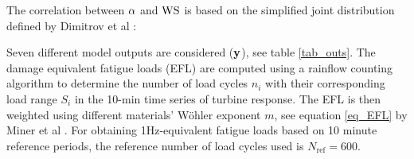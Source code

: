 \documentclass[preprint,12pt]{elsarticle}
\begin{document}

The correlation between $\alpha$ and $\text{WS}$ is based on the simplified joint distribution defined by Dimitrov et al \cite{dimitrov2015model}:



Seven different model outputs are considered ($\mathbf{y}$), see table \ref{tab_outs}. The damage equivalent fatigue loads (EFL) are computed using a rainflow counting algorithm to determine the number of load cycles $n_i$  with their corresponding load range $S_i$  in the 10-min time series of turbine response. The EFL is then weighted using different materials' W{\"o}hler exponent $m$, see equation \ref{eq_EFL} by Miner et al \cite{miner1945cumulative}. For obtaining 1Hz-equivalent fatigue loads based on 10 minute reference periods, the reference number of load cycles used is $N_{\text{ref}}=600$.


\begin{table}[!h]
\begin{centering}
\caption{Wind turbine model outputs.}
\label{tab_outs}
\end{centering}
\end{table}
\end{document}
